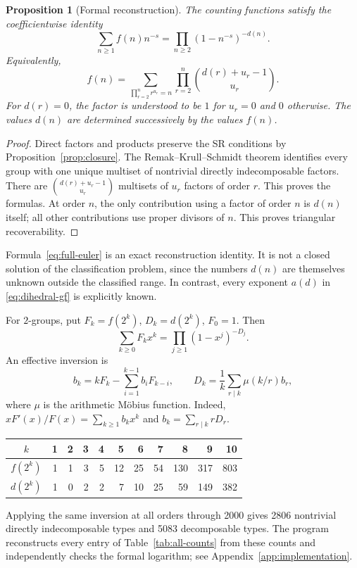 \documentclass[11pt,a4paper]{amsart}
\newtheorem{prop}[thm]{Proposition}
\theoremstyle{definition}
\theoremstyle{remark}
\numberwithin{equation}{section}
\begin{document}
\begin{prop}[Formal reconstruction]\label{prop:dirichlet-euler}
The counting functions satisfy the coefficientwise identity
\begin{equation}\label{eq:full-euler}
 \sum_{n\ge1}f(n)n^{-s}
      =\prod_{n\ge2}(1-n^{-s})^{-d(n)}.
\end{equation}
Equivalently,
\[
 f(n)=\sum_{\prod_{r=2}^{n}r^{u_r}=n}
          \prod_{r=2}^{n}\binom{d(r)+u_r-1}{u_r}.
\]
For $d(r)=0$, the factor is understood to be $1$ for $u_r=0$
and $0$ otherwise. The values $d(n)$ are determined successively
by the values $f(n)$.
\end{prop}
\begin{proof}
Direct factors and products preserve the SR conditions by
Proposition~\ref{prop:closure}. The Remak--Krull--Schmidt theorem
identifies every group with one unique
multiset of nontrivial directly indecomposable factors. There are
$\binom{d(r)+u_r-1}{u_r}$ multisets of $u_r$ factors of order $r$.
This proves the formulas. At order $n$, the only contribution using
a factor of order $n$ is $d(n)$ itself; all other contributions use
proper divisors of $n$. This proves triangular recoverability.
\end{proof}

Formula~\eqref{eq:full-euler} is an exact reconstruction identity.
It is not a closed solution of the classification problem, since
the numbers $d(n)$ are themselves unknown outside the classified
range. In contrast, every exponent $a(d)$ in
\eqref{eq:dihedral-gf} is explicitly known.

For $2$-groups, put $F_k=f(2^k)$, $D_k=d(2^k)$, $F_0=1$.
Then
\[
 \sum_{k\ge0}F_kx^k=\prod_{j\ge1}(1-x^j)^{-D_j}.
\]
An effective inversion is
\[
 b_k=kF_k-\sum_{i=1}^{k-1}b_iF_{k-i},\qquad
 D_k=\frac1k\sum_{r\mid k}\mu(k/r)b_r,
\]
where $\mu$ is the arithmetic M\"obius function. Indeed,
$xF'(x)/F(x)=\sum_{k\ge1}b_kx^k$ and
$b_k=\sum_{r\mid k}rD_r$.

\begin{center}\small
\begin{tabular}{c|rrrrrrrrrr}
\toprule
$k$&1&2&3&4&5&6&7&8&9&10\\\midrule
$f(2^k)$&1&1&3&5&12&25&54&130&317&803\\
$d(2^k)$&1&0&2&2&7&10&25&59&149&382\\
\bottomrule
\end{tabular}
\end{center}
Applying the same inversion at all orders through 2000 gives 2806
nontrivial directly indecomposable types and 5083 decomposable types.
The program  reconstructs every entry
of Table~\ref{tab:all-counts} from these counts and independently
checks the formal logarithm; see Appendix~\ref{app:implementation}.
\end{document}
